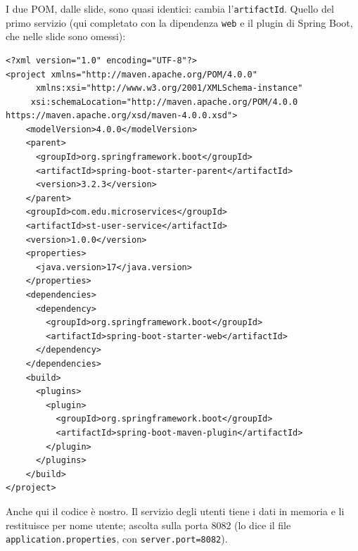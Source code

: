 I due POM, dalle slide, sono quasi identici: cambia l'\texttt{artifactId}. Quello del primo servizio (qui completato con
la dipendenza \texttt{web} e il plugin di Spring Boot, che nelle slide sono omessi):

\begin{lstlisting}[style=xml, name=st-user-service/pom.xml]
<?xml version="1.0" encoding="UTF-8"?>
<project xmlns="http://maven.apache.org/POM/4.0.0"
      xmlns:xsi="http://www.w3.org/2001/XMLSchema-instance"
     xsi:schemaLocation="http://maven.apache.org/POM/4.0.0
https://maven.apache.org/xsd/maven-4.0.0.xsd">
    <modelVersion>4.0.0</modelVersion>
    <parent>
      <groupId>org.springframework.boot</groupId>
      <artifactId>spring-boot-starter-parent</artifactId>
      <version>3.2.3</version>
    </parent>
    <groupId>com.edu.microservices</groupId>
    <artifactId>st-user-service</artifactId>
    <version>1.0.0</version>
    <properties>
      <java.version>17</java.version>
    </properties>
    <dependencies>
      <dependency>
        <groupId>org.springframework.boot</groupId>
        <artifactId>spring-boot-starter-web</artifactId>
      </dependency>
    </dependencies>
    <build>
      <plugins>
        <plugin>
          <groupId>org.springframework.boot</groupId>
          <artifactId>spring-boot-maven-plugin</artifactId>
        </plugin>
      </plugins>
    </build>
</project>
\end{lstlisting}

Anche qui il codice è nostro. Il servizio degli utenti tiene i dati in memoria e li restituisce per nome utente;
ascolta sulla porta 8082 (lo dice il file \texttt{application.properties}, con \texttt{server.port=8082}).


